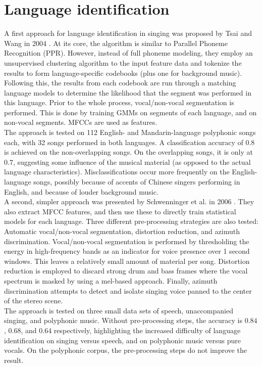 \section{Language identification}
A first approach for language identification in singing was proposed by Tsai and Wang in 2004 \cite{tsai_wang}. At its core, the algorithm is similar to Parallel Phoneme Recognition (PPR). However, instead of full phoneme modeling, they employ an unsupervised clustering algorithm to the input feature data and tokenize the results to form language-specific codebooks (plus one for background music). Following this, the results from each codebook are run through a matching language models to determine the likelihood that the segment was performed in this language. Prior to the whole process, vocal/non-vocal segmentation is performed. This is done by training GMMs on segments of each language, and on non-vocal segments. MFCCs are used as features.\\
The approach is tested on 112 English- and Mandarin-language polyphonic songs each, with 32 songs performed in both languages. A classification accuracy of $0.8$ is achieved on the non-overlapping songs. On the overlapping songs, it is only at $0.7$, suggesting some influence of the musical material (as opposed to the actual language characteristics). Misclassifications occur more frequently on the English-language songs, possibly because of accents of Chinese singers performing in English, and because of louder background music.\\

A second, simpler approach was presented by Schwenninger et al. in 2006 \cite{schwenninger}. They also extract MFCC features, and then use these to directly train statistical models for each language. Three different pre-processing strategies are also tested: Automatic vocal/non-vocal segmentation, distortion reduction, and azimuth discrimination. Vocal/non-vocal segmentation is performed by thresholding the energy in high-frequency bands as an indicator for voice presence over 1 second windows. This leaves a relatively small amount of material per song. Distortion reduction is employed to discard strong drum and bass frames where the vocal spectrum is masked by using a mel-based approach. Finally, azimuth discrimination attempts to detect and isolate singing voice panned to the center of the stereo scene.\\
The approach is tested on three small data sets of speech, unaccompanied singing, and polyphonic music. Without pre-processing steps, the accuracy is $0.84$, $0.68$, and $0.64$ respectively, highlighting the increased difficulty of language identification on singing versus speech, and on polyphonic music versus pure vocals. On the polyphonic corpus, the pre-processing steps do not improve the result.\\


